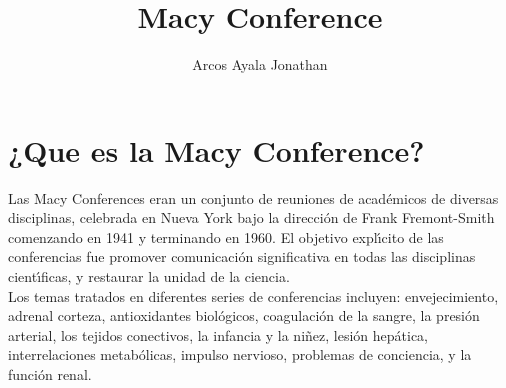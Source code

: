 \documentclass[a4paper,12pt]{article}
\title{Macy Conference}
\author{Arcos Ayala Jonathan}
\begin{document}
\maketitle

\section{¿Que es la Macy Conference?}

Las Macy Conferences eran un conjunto de reuniones de acad\'emicos de diversas disciplinas, 
celebrada en Nueva York bajo la direcci\'on de Frank Fremont-Smith comenzando en 1941 y terminando en 1960. 
El objetivo expl\'{\i}cito de las conferencias fue promover comunicaci\'on significativa en todas las disciplinas cient\'{\i}ficas, 
y restaurar la unidad de la ciencia.\\ Los temas tratados en diferentes series de conferencias incluyen: envejecimiento, adrenal corteza, 
antioxidantes biol\'ogicos, coagulaci\'on de la sangre, la presi\'on arterial, los tejidos conectivos, la infancia y la ni\~nez, 
lesi\'on hep\'atica, interrelaciones metab\'olicas, impulso nervioso, problemas de conciencia, y la funci\'on renal.
\end{document}
